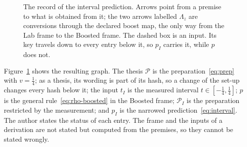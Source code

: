 \begin{figure}[t]
\centering
{}
\caption{The record of the interval prediction. Arrows point from a premise to what is obtained from it; the two arrows labelled
$\Lambda_z$ are conversions through the declared boost map, the only way from the Lab frame to the Boosted frame. The dashed box is an
input. Its key travels down to every entry below it, so $p_I$ carries it, while $p$ does not.}
\label{fig:record}
\end{figure}

\noindent Figure~\ref{fig:record} shows the resulting graph. The thesis $\mathcal P$ is the preparation~\eqref{eq:prep} with $v=\frac14$; as a thesis, its wording is part of its
hash, so a change of the set-up changes every hash below it; the input $t_I$ is the measured interval
$t\in[-\frac14,\frac14]$; $p$ is the general rule~\eqref{eq:rho-boosted} in the Boosted frame; $\mathcal P_I$ is the preparation
restricted by the measurement; and $p_I$ is the narrowed prediction~\eqref{eq:interval}. The author states the status of each entry.
The frame and the inputs of a derivation are not stated but computed from the premises, so they cannot be stated wrongly.

